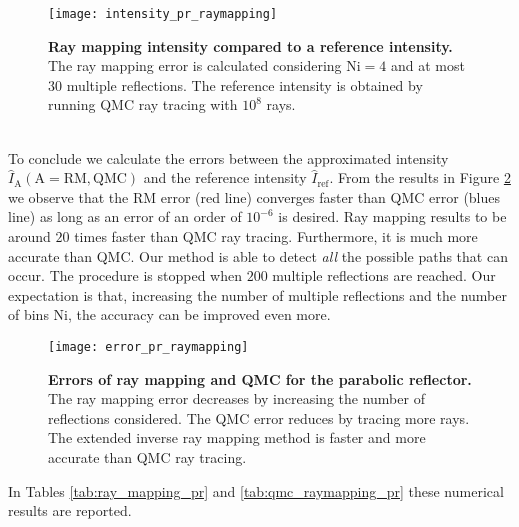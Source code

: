 \begin{figure}[t]
  \begin{center}
  \texttt{[image: intensity\_pr\_raymapping]}
  \end{center}
  \caption{\textbf{Ray mapping intensity compared to a reference intensity.}
The ray mapping error is calculated considering $\textrm{Ni}=4$ and at most $30$ multiple reflections. The reference intensity is obtained by running QMC ray tracing with $10^8$ rays.}
\label{fig:intensity_pr_raymapping}
 \end{figure}
\\ \indent
To conclude we calculate the errors between the approximated intensity $\hat{I}_{\textrm{A}} (\textrm{A}=\textrm{RM}, \textrm{QMC})$ and the reference intensity $\hat{I}_{\textrm{ref}}$. From the results in Figure \ref{fig:error_raymapping_pr} we observe that the RM error (red line) converges faster than QMC error (blues line) as long as an error of an order of $10^{-6}$ is desired. Ray mapping results to be around $20$ times faster than QMC ray tracing. Furthermore, it is much more accurate than QMC. Our method is able to detect \textit{all} the possible paths that can occur. The procedure is stopped when $200$ multiple reflections are reached. Our expectation is that, increasing the number of multiple reflections and the number of bins $\textrm{Ni}$, the accuracy can be improved even more.
\begin{figure}[h]
  \begin{center}
  \texttt{[image: error\_pr\_raymapping]}
  \end{center}
  \caption{\textbf{Errors of ray mapping and QMC for the parabolic reflector.}
The ray mapping error decreases by increasing the number of reflections considered.
The QMC error reduces by tracing more rays.
 The extended inverse ray mapping method is faster and more accurate than QMC ray tracing.}
\label{fig:error_raymapping_pr}
 \end{figure}
In Tables \ref{tab:ray_mapping_pr} and \ref{tab:qmc_raymapping_pr} these numerical results are reported.
